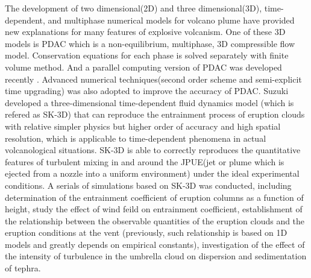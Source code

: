 \documentclass[10pt,a4paper]{article}
\begin{document}
The development of two dimensional(2D) and three dimensional(3D), time-dependent, and multiphase numerical models for volcano plume have provided new explanations for many features of explosive volcanism. One of these 3D models is PDAC \citep{neri2003multiparticle}  which is a non-equilibrium, multiphase, 3D compressible flow model. Conservation equations for each phase is solved separately with finite volume method. And a parallel computing version of PDAC was developed recently \cite{ongaro2007parallel}. Advanced numerical techniques(second order scheme and semi-explicit time upgrading) was also adopted to improve the accuracy of PDAC\cite{carcano2013semi}. 
Suzuki\citep{suzuki2005numerical} developed a three-dimensional time-dependent fluid dynamics model (which is refered as SK-3D) that can reproduce the entrainment process of eruption clouds with relative simpler physics but higher order of accuracy and high spatial resolution, which is applicable to time-dependent phenomena in actual volcanological situations. SK-3D is able to correctly reproduces the quantitative features of turbulent mixing in and around the JPUE(jet or plume which is ejected from a nozzle into a uniform environment) under the ideal experimental conditions. A serials of simulations based on SK-3D was conducted, including determination of the entrainment coefficient of eruption columns as a function of height\citep{suzuki2010numerical}, study the effect of wind feild on entrainment coefficient\citep{suzuki20133d}, establishment of the relationship between the observable quantities of the eruption clouds and the eruption conditions at the vent (previously, such relationship is based on 1D models and greatly depends on empirical constants)\citep{suzuki2009three}, investigation of the effect of the intensity of turbulence in the umbrella cloud on dispersion and sedimentation of tephra\citep{koyaguchi2009effect}. 
\end{document}
